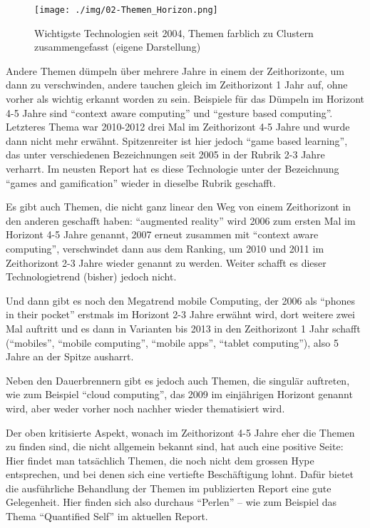 \documentclass[a4paper,
fontsize=11pt,
oneside,
numbers=noperiodatend,
parskip=half-,
bibliography=totoc,
final
]{scrartcl}
\begin{document}
\begin{figure}[htbp]
\centering
\texttt{[image: ./img/02-Themen\_Horizon.png]}
\caption{Wichtigste Technologien seit 2004, Themen farblich zu Clustern
zusammengefasst (eigene Darstellung)}
\end{figure}

Andere Themen dümpeln über mehrere Jahre in einem der Zeithorizonte, um
dann zu verschwinden, andere tauchen gleich im Zeithorizont 1 Jahr auf,
ohne vorher als wichtig erkannt worden zu sein. Beispiele für das
Dümpeln im Horizont 4-5 Jahre sind \enquote{context aware computing} und
\enquote{gesture based computing}. Letzteres Thema war 2010-2012 drei
Mal im Zeithorizont 4-5 Jahre und wurde dann nicht mehr erwähnt.
Spitzenreiter ist hier jedoch \enquote{game based learning}, das unter
verschiedenen Bezeichnungen seit 2005 in der Rubrik 2-3 Jahre verharrt.
Im neusten Report hat es diese Technologie unter der Bezeichnung
\enquote{games and gamification} wieder in dieselbe Rubrik geschafft.

Es gibt auch Themen, die nicht ganz linear den Weg von einem
Zeithorizont in den anderen geschafft haben: \enquote{augmented reality}
wird 2006 zum ersten Mal im Horizont 4-5 Jahre genannt, 2007 erneut
zusammen mit \enquote{context aware computing}, verschwindet dann aus
dem Ranking, um 2010 und 2011 im Zeithorizont 2-3 Jahre wieder genannt
zu werden. Weiter schafft es dieser Technologietrend (bisher) jedoch
nicht.

Und dann gibt es noch den Megatrend mobile Computing, der 2006 als
\enquote{phones in their pocket} erstmals im Horizont 2-3 Jahre erwähnt
wird, dort weitere zwei Mal auftritt und es dann in Varianten bis 2013
in den Zeithorizont 1 Jahr schafft (\enquote{mobiles}, \enquote{mobile
computing}, \enquote{mobile apps}, \enquote{tablet computing}), also 5
Jahre an der Spitze ausharrt.

Neben den Dauerbrennern gibt es jedoch auch Themen, die singulär
auftreten, wie zum Beispiel \enquote{cloud computing}, das 2009 im
einjährigen Horizont genannt wird, aber weder vorher noch nachher wieder
thematisiert wird.

Der oben kritisierte Aspekt, wonach im Zeithorizont 4-5 Jahre eher die
Themen zu finden sind, die nicht allgemein bekannt sind, hat auch eine
positive Seite: Hier findet man tatsächlich Themen, die noch nicht dem
grossen Hype entsprechen, und bei denen sich eine vertiefte
Beschäftigung lohnt. Dafür bietet die ausführliche Behandlung der Themen
im publizierten Report eine gute Gelegenheit. Hier finden sich also
durchaus \enquote{Perlen} -- wie zum Beispiel das Thema
\enquote{Quantified Self} im aktuellen Report.
\end{document}
